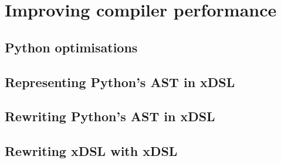 \chapter{Improving compiler performance}
\label{chap:improving-compiler-performance}

\section{Python optimisations}
\label{sec:}

\section{Representing Python's AST in xDSL}
\label{sec:}

\section{Rewriting Python's AST in xDSL}
\label{sec:}


\section{Rewriting xDSL with xDSL}
\label{sec:}

